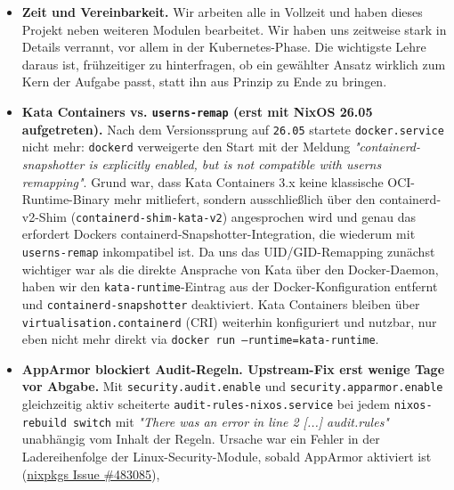 \begin{itemize}
    haben sie sich aber je nach Proxmox-Konfiguration unterschiedlich verhalten,
    insbesondere wenn nested-virtualization
    nicht stabil verfügbar war. Damit das Setup auf möglichst vielen Hosts ohne
    Probleme startet, haben wir beide Runtimes vorbereitet, aber nicht als
    Standard gesetzt. Sie lassen sich pro Dienst aktivieren, sobald die Hardware
    das stabil unterstützt.
  \item \textbf{Zeit und Vereinbarkeit.} Wir arbeiten alle in Vollzeit und haben
    dieses Projekt neben weiteren Modulen bearbeitet. Wir haben uns zeitweise
    stark in Details verrannt, vor allem in der Kubernetes-Phase. Die wichtigste
    Lehre daraus ist, frühzeitiger zu hinterfragen, ob ein gewählter Ansatz
    wirklich zum Kern der Aufgabe passt, statt ihn aus Prinzip zu Ende zu bringen.
  \item\textbf{Kata Containers vs. \texttt{userns-remap} (erst mit NixOS 26.05
    aufgetreten).} Nach dem Versionssprung auf \texttt{26.05} startete
    \texttt{docker.service} nicht mehr: \texttt{dockerd} verweigerte den Start
    mit der Meldung \textit{"containerd-snapshotter is explicitly enabled, but
    is not compatible with userns remapping"}. Grund war, dass Kata Containers 3.x
    keine klassische OCI-Runtime-Binary mehr mitliefert, sondern ausschließlich
    über den containerd-v2-Shim (\texttt{containerd-shim-kata-v2}) angesprochen
    wird und genau das erfordert Dockers containerd-Snapshotter-Integration,
    die wiederum mit \texttt{userns-remap} inkompatibel ist. Da uns das
    UID/GID-Remapping zunächst wichtiger war als die direkte Ansprache von Kata über den Docker-Daemon, haben wir den
    \texttt{kata-runtime}-Eintrag aus der Docker-Konfiguration entfernt und
    \texttt{containerd-snapshotter} deaktiviert. Kata Containers bleiben über
    \texttt{virtualisation.containerd} (CRI) weiterhin konfiguriert und nutzbar,
    nur eben nicht mehr direkt via \texttt{docker run --runtime=kata-runtime}.
  \item \textbf{AppArmor blockiert Audit-Regeln. Upstream-Fix erst wenige Tage
    vor Abgabe.} Mit \texttt{security.audit.enable} und
    \texttt{security.apparmor.enable} gleichzeitig aktiv scheiterte
    \texttt{audit-rules-nixos.service} bei jedem \texttt{nixos-rebuild switch}
    mit \textit{"There was an error in line 2 [...] audit.rules"} unabhängig vom Inhalt 
    der Regeln. Ursache war ein Fehler in der Ladereihenfolge der Linux-Security-Module,
    sobald AppArmor aktiviert ist
    (\href{https://github.com/NixOS/nixpkgs/issues/483085}{nixpkgs Issue \#483085}),

\end{itemize}
